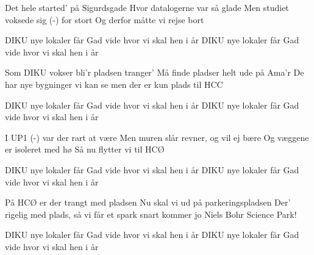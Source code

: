 \documentclass[a4paper,11pt]{article}
\begin{document}
\begin{song}

   Det hele started' på Sigurdsgade
             Hvor datalogerne var så glade
   Men studiet voksede sig (-) for stort
             Og derfor måtte vi rejse bort


   DIKU nye lokaler får
                Gad vide hvor vi skal hen i år
   DIKU nye lokaler får
               Gad vide hvor vi skal hen i år

   Som DIKU vokser bli'r pladsen tranger'
             Må finde pladser helt ude på Ama'r
   De har nye bygninger vi kan se
             men der er kun plads til HCC


   DIKU nye lokaler får
                Gad vide hvor vi skal hen i år
   DIKU nye lokaler får
               Gad vide hvor vi skal hen i år

   I UP1 (-) var der rart at være
             Men muren slår revner, og vil ej bære
   Og væggene er isoleret med hø
             Så nu flytter vi til HCØ


   DIKU nye lokaler får
                Gad vide hvor vi skal hen i år
   DIKU nye lokaler får
               Gad vide hvor vi skal hen i år

   På HCØ er der trangt med pladsen
             Nu skal vi ud på parkeringspladsen
   Der' rigelig med plads, så vi får et spark
             snart kommer jo Niels Bohr Science Park!


   DIKU nye lokaler får
                Gad vide hvor vi skal hen i år
   DIKU nye lokaler får
               Gad vide hvor vi skal hen i år



\end{song}
\end{document}
